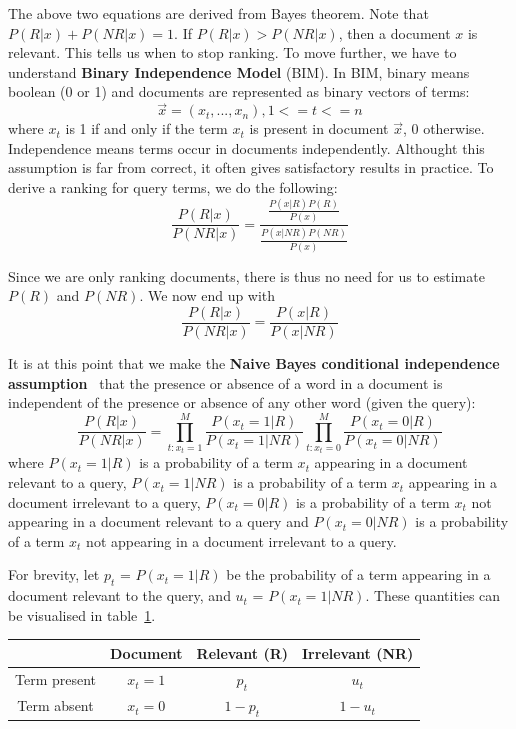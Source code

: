 The above two equations are derived from Bayes theorem.
Note that $P(R|x) + P(NR|x) = 1$. If $P(R|x) > P(NR|x)$, then a document $x$ is relevant. This tells us when to stop ranking. To move further, we have
to understand \textbf{Binary Independence Model} (BIM). In BIM, binary means boolean (0 or 1) and documents are represented as binary vectors of terms:
\[\vec{x} = (x_t,...,x_n), 1 <= t <= n\] where $x_t$ is 1 if and only if the term $x_t$ is present in document $\vec{x}$, 0 otherwise. Independence means terms occur
in documents independently. Althought this assumption is far from correct, it often gives satisfactory results in practice.
To derive a ranking for query terms, we do the following:
\begin{equation}
\frac{P(R|x)}{P(NR|x)} = \frac{\frac{P(x|R)P(R)}{P(x)}}{\frac{P(x|NR)P(NR)}{P(x)}}
\end{equation}

Since we are only ranking documents, there is thus no need for us to estimate $P(R)$ and $P(NR)$. We now end up with 
\begin{equation}
\frac{P(R|x)}{P(NR|x)} = \frac{P(x|R)}{P(x|NR)}
\end{equation}


It is at this point that
we make the \textbf{Naive Bayes conditional independence assumption}~\cite[P. 261]{introToIR} that the presence
or absence of a word in a document is independent of the presence or absence
of any other word (given the query):
\begin{equation} \label{eq:prod}
\frac{P(R|x)}{P(NR|x)} = \prod_{t:x_t=1}^M\frac{P(x_t = 1|R)}{P(x_t = 1|NR)} \prod_{t:x_t=0}^M\frac{P(x_t = 0|R)}{P(x_t = 0|NR)}
\end{equation}
where ${P(x_t = 1|R)}$ is a probability of a term $x_t$ appearing in a document relevant to a query, ${P(x_t = 1|NR)}$ is a probability of a term $x_t$ appearing in a document irrelevant
to a query, $P(x_t = 0|R)$ is a probability of a term $x_t$ not appearing in a document relevant to a query and 
$P(x_t = 0|NR)$ is a probability of a term $x_t$ not appearing in a document irrelevant to a query. 


For brevity, let $p_t$ = ${P(x_t = 1|R)}$ be the probability of a term appearing in a document relevant to the query, and $u_t$ = $P(x_t = 1|NR)$.
These quantities can be visualised in table~\ref{table:bim}.

\begin{table}
 \centering
\begin{tabular}{|c|c|c|c|}
\hline  & \textbf{Document} & \textbf{Relevant (R)} & \textbf{Irrelevant (NR)} \\
\hline Term present & $x_t = 1$ & $p_t$ & $u_t$\\
\hline Term absent & $x_t = 0$ & $1 - p_t$ & $1 - u_t$ \\ 
\hline
\end{tabular}
\label{table:bim}
\end{table}


